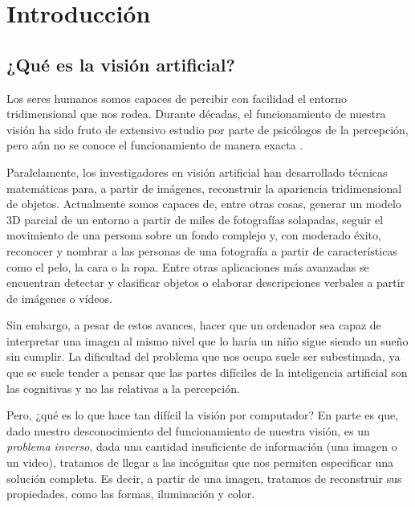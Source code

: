 \section{Introducción}
\subsection{¿Qué es la visión artificial?}
Los seres humanos somos capaces de percibir con facilidad el entorno tridimensional que nos rodea. Durante décadas, el funcionamiento de nuestra visión ha sido fruto de extensivo estudio por parte de psicólogos de la percepción, pero aún no se conoce el funcionamiento de manera exacta  \cite{book:szeliski}.

Paralelamente, los investigadores en visión artificial han desarrollado técnicas matemáticas para, a partir de imágenes, reconstruir la apariencia tridimensional de objetos. Actualmente somos capaces de, entre otras cosas, generar un modelo 3D parcial de un entorno a partir de miles de fotografías solapadas, seguir el movimiento de una persona sobre un fondo complejo y, con moderado éxito, reconocer y nombrar a las personas de una fotografía a partir de características como el pelo, la cara o la ropa. Entre otras aplicaciones más avanzadas se encuentran detectar y clasificar objetos o elaborar descripciones verbales a partir de imágenes o vídeos.

Sin embargo, a pesar de estos avances, hacer que un ordenador sea capaz de interpretar una imagen al mismo nivel que lo haría un niño sigue siendo un sueño sin cumplir. La dificultad del problema que nos ocupa suele ser subestimada, ya que se suele tender a pensar que las partes difíciles de la inteligencia artificial son las cognitivas y no las relativas a la percepción. 

Pero, ¿qué es lo que hace tan difícil la visión por computador? En parte es que, dado nuestro desconocimiento del funcionamiento de nuestra visión, es un \textit{problema inverso}, dada una cantidad insuficiente de información (una imagen o un video), tratamos de llegar a las incógnitas que nos permiten especificar una solución completa. Es decir, a partir de una imagen, tratamos de reconstruir sus propiedades, como las formas, iluminación y color.

